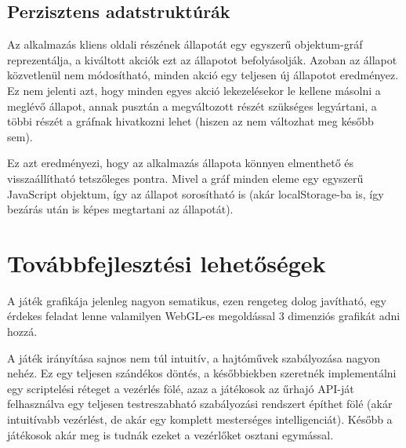 \documentclass[12pt]{article}
\begin{document}
\subsection{Perzisztens adatstruktúrák}

Az alkalmazás kliens oldali részének állapotát egy egyszerű objektum-gráf
reprezentálja, a kiváltott akciók ezt az állapotot befolyásolják.
Azoban az állapot közvetlenül nem módosítható, minden akció egy teljesen
új állapotot eredményez. Ez nem jelenti azt, hogy minden egyes akció lekezelésekor
le kellene másolni a meglévő állapot, annak pusztán a megváltozott részét szükséges
legyártani, a többi részét a gráfnak hivatkozni lehet (hiszen az nem változhat meg később sem).

Ez azt eredményezi, hogy az alkalmazás állapota könnyen elmenthető és visszaállítható
tetszőleges pontra. Mivel a gráf minden eleme egy egyszerű JavaScript objektum,
így az állapot sorosítható is (akár localStorage-ba is, így bezárás után is képes megtartani az állapotát).

\section{Továbbfejlesztési lehetőségek}

A játék grafikája jelenleg nagyon sematikus, ezen rengeteg dolog javítható,
egy érdekes feladat lenne valamilyen WebGL-es megoldással 3 dimenziós grafikát
adni hozzá.

A játék irányítása sajnos nem túl intuitív, a hajtóművek szabályozása nagyon
nehéz. Ez egy teljesen szándékos döntés, a későbbiekben szeretnék implementálni
egy scriptelési réteget a vezérlés fölé, azaz a játékosok az űrhajó API-ját
felhasználva egy teljesen testreszabható szabályozási rendszert építhet fölé
(akár intuitívabb vezérlést, de akár egy komplett mesterséges intelligenciát).
Később a játékosok akár meg is tudnák ezeket a vezérlőket osztani egymással.
\end{document}
